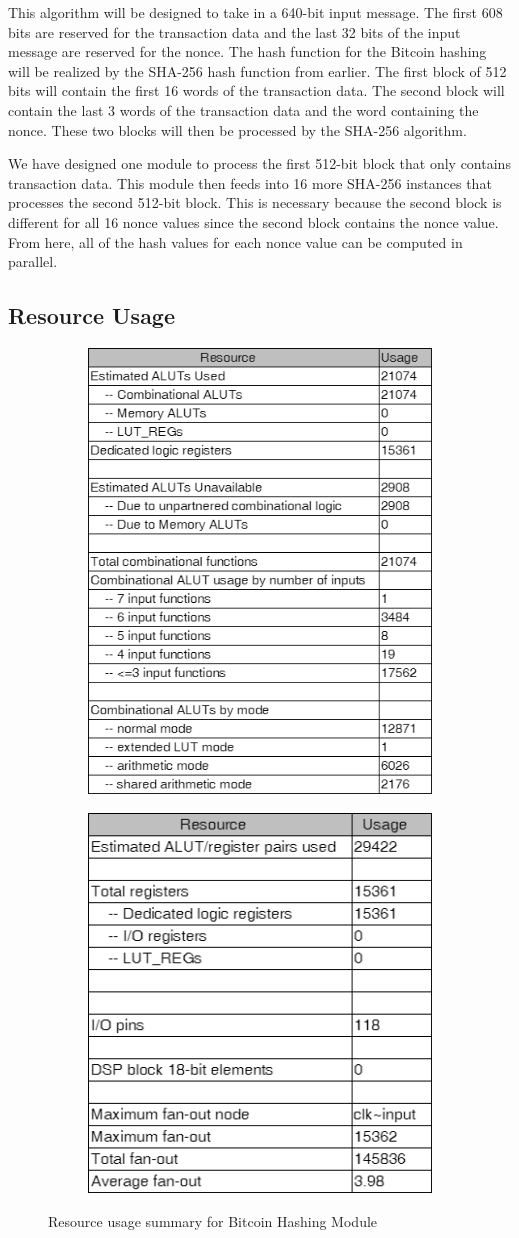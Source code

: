 \documentclass{article}
\begin{document}
This algorithm will be designed to take in a 640-bit input message. The first 608 bits are reserved for the transaction data and the last 32 bits of the input message are reserved for the nonce. The hash function for the Bitcoin hashing will be realized by the SHA-256 hash function from earlier. The first block of 512 bits will contain the first 16 words of the transaction data. The second block will contain the last 3 words of the transaction data and the word containing the nonce. These two blocks will then be processed by the SHA-256 algorithm.

We have designed one module to process the first 512-bit block that only contains transaction data. This module then feeds into 16 more SHA-256 instances that processes the second 512-bit block. This is necessary because the second block is different for all 16 nonce values since the second block contains the nonce value. From here, all of the hash values for each nonce value can be computed in parallel.


\subsection{Resource Usage}

\begin{figure}[H]
  \centering
  \begin{subfigure}
    \centering
    \includegraphics[width=0.45\linewidth]{r1.png}
  \end{subfigure}
  \begin{subfigure}
    \centering
    \includegraphics[width=0.45\linewidth]{r2.png}
  \end{subfigure}
  \caption{Resource usage summary for Bitcoin Hashing Module}
\end{figure}
\end{document}

